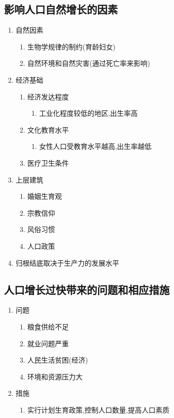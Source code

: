 \documentclass[a4paper]{article}
\begin{document}
    \subsection{影响人口自然增长的因素}
    \begin{enumerate}
        \item 自然因素
        \begin{enumerate}
            \item 生物学规律的制约(育龄妇女)
            \item 自然环境和自然灾害(通过死亡率来影响)
        \end{enumerate}
        \item 经济基础
        \begin{enumerate}
            \item 经济发达程度
            \begin{enumerate}
                \item 工业化程度较低的地区,出生率高
            \end{enumerate}
            \item 文化教育水平
            \begin{enumerate}
                \item 女性人口受教育水平越高,出生率越低
            \end{enumerate}
            \item 医疗卫生条件
        \end{enumerate}
        \item 上层建筑
        \begin{enumerate}
            \item 婚姻生育观
            \item 宗教信仰
            \item 风俗习惯
            \item 人口政策
        \end{enumerate}
        \item 归根结底取决于生产力的发展水平
    \end{enumerate}
    \subsection{人口增长过快带来的问题和相应措施}
    \begin{enumerate}
        \item 问题
        \begin{enumerate}
            \item 粮食供给不足
            \item 就业问题严重
            \item 人民生活贫困(经济)
            \item 环境和资源压力大
        \end{enumerate}
        \item 措施
        \begin{enumerate}
            \item 实行计划生育政策,控制人口数量,提高人口素质
        \end{enumerate}
    \end{enumerate}
\end{document}
